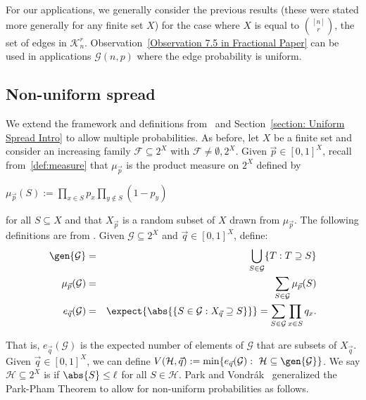 \documentclass[12pt]{article}
\begin{document}
For our applications, we generally consider the previous results (these were stated more generally for any finite set $X$) for the case where $X$ is equal to $\binom{[n]}{r}$, the set of edges in $\mathcal{K}_n^r$. Observation~\ref{Observation 7.5 in Fractional Paper} can be used in applications $\mathcal{G}(n,p)$ where the edge probability is uniform.


\subsection{Non-uniform spread} 
\label{section: Non-Uniform Spread}

We extend the framework and definitions from~\cite{frankston2019thresholds} and Section~\ref{section: Uniform Spread Intro} to allow multiple probabilities. As before, let $X$ be a finite set and consider an increasing family $\mathcal{F}\subseteq 2^X$ with $\mathcal{F}\neq\emptyset, 2^X$. Given $\vec{p}\in [0,1]^X$, recall from~\eqref{def:measure} that $\mu_{\vec{p}}$ is the product measure on $2^X$ defined by
\begin{center}
    $\mu_{\vec{p}}(S) := \prod\limits_{x\in S} p_x\prod\limits_{y\notin S} (1-p_y)$
\end{center}
for all $S\subseteq X$ and that $X_{\vec{p}}$ is a random subset of $X$ drawn from $\mu_{\vec{p}}$. The following definitions are from \cite{park2023simple}. Given $\mathcal{G}\subseteq 2^X$ and $\vec{q}\in [0,1]^X$, define:
\begin{eqnarray}
\gen{\mathcal{G}} &=& \bigcup\limits_{S\in\mathcal{G}} \{T: T\supseteq S\}\\
\mu_{\vec{p}}(\mathcal{G}) &=& \displaystyle\sum\limits_{S\in\mathcal{G}} \mu_{\vec{p}}(S)\\
    e_{\vec{q}}(\mathcal{G}) &=& \expect{\abs{\{S\in\mathcal{G}: X_{\vec{q}}\supseteq S\}}} = \displaystyle\sum\limits_{S\in\mathcal{G}} \prod\limits_{x\in S} q_x\label{defn: e_q}.
\end{eqnarray}



\noindent That is, $e_{\vec{q}}(\mathcal{G})$ is the expected number of elements of $\mathcal{G}$ that are subsets of $X_{\vec{q}}$. Given $\vec{q}\in [0,1]^X$, we can define $V(\mathcal{H}, \vec{q}) := \min\{e_{\vec{q}}(\mathcal{G}):\ \mathcal{H}\subseteq \gen{\mathcal{G}}\}$. We say $\mathcal{H}\subseteq 2^X$ is  if $\abs{S}\leq\ell$ for all $S\in\mathcal{H}$.  Park and Vondr{\'a}k~\cite{park2023simple} generalized the Park-Pham Theorem to allow for non-uniform probabilities as follows.
\end{document}
